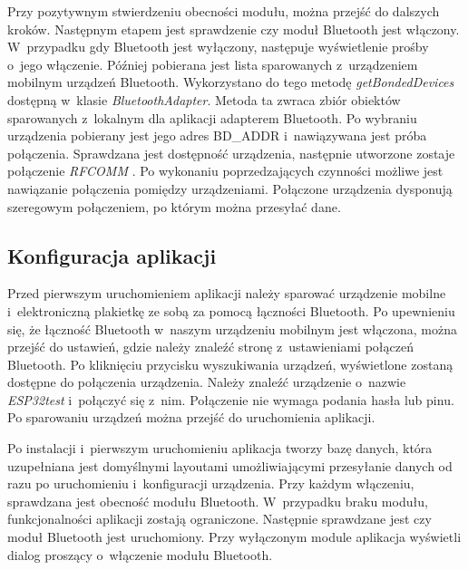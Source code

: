 \documentclass[a4paper,12pt, twoside]{article}
\begin{document}
    	Przy pozytywnym stwierdzeniu obecności modułu, można przejść do dalszych kroków. Następnym etapem jest sprawdzenie czy moduł Bluetooth jest włączony. W~przypadku gdy Bluetooth jest wyłączony, następuje wyświetlenie prośby o~jego włączenie. Później pobierana jest lista sparowanych z~urządzeniem mobilnym urządzeń Bluetooth. Wykorzystano do tego metodę \textit{getBondedDevices}\cite{bonded} dostępną w~klasie \textit{BluetoothAdapter}. Metoda ta zwraca zbiór obiektów sparowanych z~lokalnym dla aplikacji adapterem Bluetooth. Po wybraniu urządzenia pobierany jest jego adres BD\_ADDR i~nawiązywana jest próba połączenia. Sprawdzana jest dostępność urządzenia, następnie utworzone zostaje połączenie \textit{RFCOMM} \cite{rfcomm}. Po wykonaniu poprzedzających czynności możliwe jest nawiązanie połączenia pomiędzy urządzeniami. Połączone urządzenia dysponują szeregowym połączeniem, po którym można przesyłać dane.
    	
    	
    	
    	\subsection{Konfiguracja aplikacji}
    	Przed pierwszym uruchomieniem aplikacji należy sparować urządzenie mobilne i~elektroniczną plakietkę ze sobą za pomocą łączności Bluetooth. Po upewnieniu się, że łączność Bluetooth w~naszym urządzeniu mobilnym jest włączona, można przejść do ustawień, gdzie należy znaleźć stronę z~ustawieniami połączeń Bluetooth. Po kliknięciu przycisku wyszukiwania urządzeń, wyświetlone zostaną dostępne do połączenia urządzenia. Należy znaleźć urządzenie o~nazwie \textit{ESP32test} i~połączyć się z~nim. Połączenie nie wymaga podania hasła lub pinu. Po sparowaniu urządzeń można przejść do uruchomienia aplikacji. 
    	
    	Po instalacji i~pierwszym uruchomieniu aplikacja tworzy bazę danych, która uzupełniana jest domyślnymi layoutami umożliwiającymi przesyłanie danych od razu po uruchomieniu i~konfiguracji urządzenia. Przy każdym włączeniu, sprawdzana jest obecność modułu Bluetooth. W~przypadku braku modułu, funkcjonalności aplikacji zostają ograniczone. Następnie sprawdzane jest czy moduł Bluetooth jest uruchomiony. Przy wyłączonym module aplikacja wyświetli dialog proszący o~włączenie modułu Bluetooth.
    	
\end{document}
